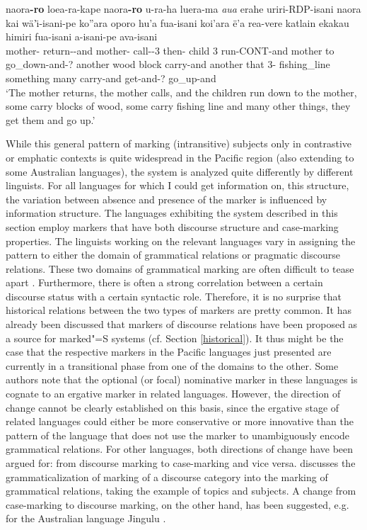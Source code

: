 \begin{exe} \ex\label{KakEmphEx1}
\raggedright
\gll naora\textbf{-ro} loea-ra-kape naora\textbf{-ro} u-ra-ha luera-ma \emph{aua} erahe uriri-RDP-isani naora kai w\"a'\"\i-isani-pe ko''ara oporo hu'a fua-isani koi'ara \"e'a rea-vere katlain ekakau himiri fua-isani a-isani-pe ava-isani\\
mother-\erg{} return-\irr{}-and mother-\erg{} call-\irr{}-3\ssbj{} then-\loc{} child 3\pl{} run-CONT-and mother to go\_down-and-? another wood block carry-and another that 3\sg{}-\poss{} fishing\_line something many carry-and get-and-? go\_up-and\\
\glt `The mother returns, the mother calls, and the children run down to the mother, some carry blocks of wood, some carry fishing line and many other things, they get them and go up.'
\end{exe}

While this general pattern of marking (intransitive) subjects only in con\-tras\-tive or emphatic contexts is quite widespread in the Pacific region (also extending to some Australian languages), the system is analyzed quite differently by different linguists. 
For all languages for which I could get information on, this structure, the variation between absence and presence of the marker is influenced by information structure. 
The languages exhibiting the system described in this section employ markers that have both discourse structure and case-marking properties. 
The linguists working on the relevant languages vary in assigning the pattern to either the domain of grammatical relations or pragmatic discourse relations.
These two domains of grammatical marking are often difficult to tease apart \citep[276]{Payne:1997}. 
Furthermore, there is often a strong correlation between a certain discourse status with a certain syntactic role. 
Therefore, it is no surprise that historical relations between the two types of markers are pretty common.  
It has already been discussed that markers of discourse relations have been proposed as a source for marked"=S systems (cf. Section \ref{historical}). 
It thus might be the case that the respective markers in the Pacific languages just presented are currently in a transitional phase from one of the domains to the other.
Some authors note that the optional (or focal) nominative marker in these languages is cognate to an ergative marker in related languages. 
However, the direction of change cannot be clearly established on this basis, since the ergative stage of related languages could either be more conservative or more innovative than the pattern of the language that does not use the marker to unambiguously encode grammatical relations. 
For other languages, both directions of change have been argued for: from discourse marking to case-marking and vice versa.
\citet{Shibatani:1991} discusses the grammaticalization of marking of a discourse category into the marking of grammatical relations, taking the example of topics and subjects. 
A change from case-marking to discourse marking, on the other hand, has been suggested, e.g. for the Australian language Jingulu \citep{Pensalfini:1999}.

